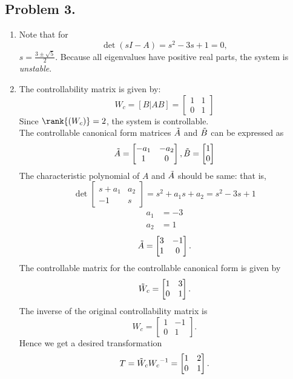 \documentclass{article}
\begin{document}
\subsection*{Problem 3.}
    \begin{enumerate}
    \item
    Note that for
    $$ \det(sI-A)=s^{2}-3s+1=0, $$
    $s=\frac{3 \pm \sqrt{5}}{2}.$ Because all eigenvalues have positive real parts, the system is \textit{unstable}.
    
    \item
    The controllability matrix is given by:
    $$ W_{c}=[B|AB]=
    \left[
    \begin{matrix}
    1 & 1 \\
    0 & 1
    \end{matrix}
    \right] $$
    Since $\rank{(W_{c})}=2$, the system is controllable. \\
    The controllable canonical form matrices $\Tilde{A}$ and $\Tilde{B}$ can be expressed as
    $$ \Tilde{A}=
    \left[
    \begin{matrix}
    -a_{1} & -a_{2} \\
    1 & 0
    \end{matrix}
    \right],
    \Tilde{B}=
    \left[
    \begin{matrix}
    1 \\
    0 
    \end{matrix}
    \right] $$
    The characteristic polynomial of $A$ and $\Tilde{A}$ should be same: that is,
    $$ \det
    \left[
    \begin{matrix}
    s+a_{1} & a_{2} \\
    -1 & s
    \end{matrix}
    \right]
    =s^{2}+a_1s+a_2=s^2-3s+1 $$
    \begin{align}
    a_1&=-3 \\
    a_2&=1 
    \end{align}
    $$ \Tilde{A}= \left[ \begin{matrix}
    3 & -1 \\
    1 & 0
    \end{matrix} \right]. $$
    The controllable matrix for the controllable canonical form is given by
    $$ \Tilde{W}_{c}= \left[ \begin{matrix}
    1 & 3 \\
    0 & 1
    \end{matrix} \right]. $$
    The inverse of the original controllability matrix is
    $$ {W}_{c}= \left[ \begin{matrix}
    1 & -1 \\
    0 & 1
    \end{matrix} \right]. $$
    Hence we get a desired transformation
    $$ T=\Tilde{W}_c{W_c}^{-1}= \left[ \begin{matrix}
    1 & 2 \\
    0 & 1
    \end{matrix} \right]. $$
    

\end{enumerate}
\end{document}
